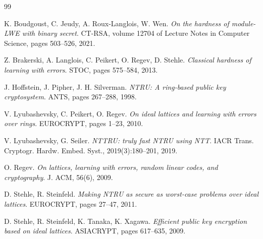 \documentclass{aicr-conjecture}
\begin{document}
\begin{aicrbibliography}{99}

K. Boudgoust, C. Jeudy, A. Roux-Langlois, W. Wen.
\emph{On the hardness of module-LWE with binary secret}.
CT-RSA, volume 12704 of Lecture Notes in Computer Science, pages
503--526, 2021.

Z. Brakerski, A. Langlois, C. Peikert, O. Regev, D. Stehle.
\emph{Classical hardness of learning with errors}.
STOC, pages 575--584, 2013.

J. Hoffstein, J. Pipher, J. H. Silverman.
\emph{NTRU: A ring-based public key cryptosystem}.
ANTS, pages 267--288, 1998.

V. Lyubashevsky, C. Peikert, O. Regev.
\emph{On ideal lattices and learning with errors over rings}.
EUROCRYPT, pages 1--23, 2010.

V. Lyubashevsky, G. Seiler.
\emph{NTTRU: truly fast NTRU using NTT}.
IACR Trans. Cryptogr. Hardw. Embed. Syst., 2019(3):180--201, 2019.

O. Regev.
\emph{On lattices, learning with errors, random linear codes, and
cryptography}.
J. ACM, 56(6), 2009.

D. Stehle, R. Steinfeld.
\emph{Making NTRU as secure as worst-case problems over ideal
lattices}.
EUROCRYPT, pages 27--47, 2011.

D. Stehle, R. Steinfeld, K. Tanaka, K. Xagawa.
\emph{Efficient public key encryption based on ideal lattices}.
ASIACRYPT, pages 617--635, 2009.

\end{aicrbibliography}
\end{document}
